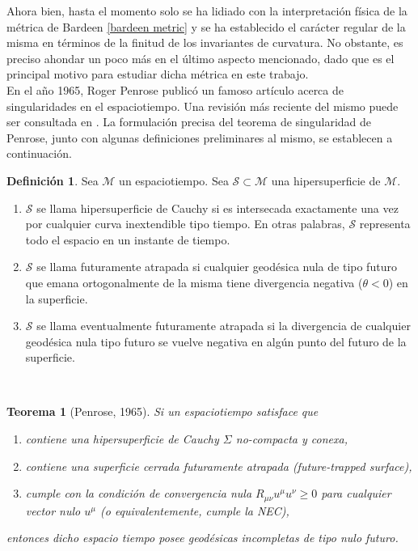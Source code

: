 \documentclass[16pt,a4paper]{article}
\numberwithin{equation}{section}
\newtheorem{theorem}{Teorema}[section]
\theoremstyle{definition}
\newtheorem{definition}{Definición}[section]
\begin{document}
Ahora bien, hasta el momento solo se ha lidiado con la interpretación física de la métrica de Bardeen \eqref{bardeen metric} y se ha establecido el carácter regular de la misma en términos de la finitud de los invariantes de curvatura. No obstante, es preciso ahondar un poco más en el último aspecto mencionado, dado que es el principal motivo para estudiar dicha métrica en este trabajo.\\

En el año 1965, Roger Penrose publicó un famoso artículo \cite{penrose} acerca de singularidades en el espaciotiempo. Una revisión más reciente del mismo puede ser consultada en \cite{senovilla2015}. La formulación precisa del teorema de singularidad de Penrose, junto con algunas definiciones preliminares al mismo, se establecen a continuación. 

\theoremstyle{definition}
\begin{definition}
\label{trapped surfaces}
	Sea $\mathcal{M}$ un espaciotiempo. Sea $\mathcal{S} \subset \mathcal{M}$ una hipersuperficie de $\mathcal{M}$.
	\begin{enumerate}[i]
		\item $\mathcal{S}$ se llama hipersuperficie de Cauchy si es intersecada exactamente una vez por cualquier curva inextendible tipo tiempo. En otras palabras, $\mathcal{S}$ representa todo el espacio en un instante de tiempo. 
		
		\item $\mathcal{S}$ se llama futuramente atrapada si cualquier geodésica nula de tipo futuro que emana ortogonalmente de la misma tiene divergencia negativa ($\theta < 0$) en la superficie.
		
		\item $\mathcal{S}$ se llama eventualmente futuramente atrapada si la divergencia de cualquier geodésica nula tipo futuro se vuelve negativa en algún punto del futuro de la superficie.
	\end{enumerate}
\end{definition}
\
\begin{theorem}[Penrose, 1965]
\label{penrose sing thm}
Si un espaciotiempo satisface que

\begin{enumerate}[i]
\item contiene una hipersuperficie de Cauchy $\Sigma$ no-compacta y conexa,

\item contiene una superficie cerrada futuramente atrapada (future-trapped surface),

\item cumple con la condición de convergencia nula $R_{\mu \nu}u^{\mu}u^{\nu} \geq 0$ para cualquier vector nulo $u^{\mu}$ (o equivalentemente, cumple la NEC),
\end{enumerate}

entonces dicho espacio tiempo posee geodésicas incompletas de tipo nulo futuro.
\end{theorem}
\
\end{document}
